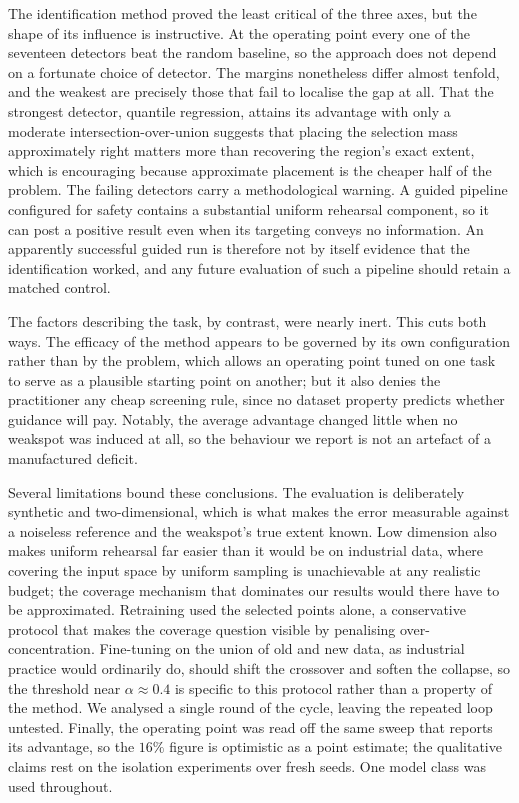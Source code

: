\documentclass[conference]{IEEEtran}
\begin{document}
The identification method proved the least critical of the three axes, but the shape of
its influence is instructive. At the operating point every one of the seventeen
detectors beat the random baseline, so the approach does not depend on a fortunate
choice of detector. The margins nonetheless differ almost tenfold, and the weakest are
precisely those that fail to localise the gap at all. That the strongest detector,
quantile regression, attains its advantage with only a moderate
intersection-over-union suggests that placing the selection mass approximately right
matters more than recovering the region's exact extent, which is encouraging because
approximate placement is the cheaper half of the problem. The failing detectors carry a
methodological warning. A guided pipeline configured for safety contains a substantial
uniform rehearsal component, so it can post a positive result even when its targeting
conveys no information. An apparently successful guided run is therefore not by itself
evidence that the identification worked, and any future evaluation of such a pipeline
should retain a matched control.

The factors describing the task, by contrast, were nearly inert. This cuts both ways.
The efficacy of the method appears to be governed by its own configuration rather than
by the problem, which allows an operating point tuned on one task to serve as a
plausible starting point on another; but it also denies the practitioner any cheap
screening rule, since no dataset property predicts whether guidance will pay. Notably,
the average advantage changed little when no weakspot was induced at all, so the
behaviour we report is not an artefact of a manufactured deficit.

Several limitations bound these conclusions. The evaluation is deliberately synthetic
and two-dimensional, which is what makes the error measurable against a noiseless
reference and the weakspot's true extent known. Low dimension also makes uniform
rehearsal far easier than it would be on industrial data, where covering the input space
by uniform sampling is unachievable at any realistic budget; the coverage mechanism that
dominates our results would there have to be approximated. Retraining used the selected
points alone, a conservative protocol that makes the coverage question visible by
penalising over-concentration. Fine-tuning on the union of old and new data, as
industrial practice would ordinarily do, should shift the crossover and soften the
collapse, so the threshold near $\alpha\approx0.4$ is specific to this protocol rather
than a property of the method. We analysed a single round of the cycle, leaving the
repeated loop untested. Finally, the operating point was read off the same sweep that
reports its advantage, so the $16\%$ figure is optimistic as a point estimate; the
qualitative claims rest on the isolation experiments over fresh seeds. One model class
was used throughout.
\end{document}
